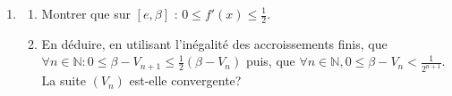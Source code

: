 \begin{exo}
\begin{description}
\begin{enumerate}
\begin{enumerate}
                                    \item En d\'eduire que $\beta \in [e , 3]$.
                                    \item Montrer par r\'ecurrence que : $\forall n \in \mathbb{N} , V_n \in [3 , \beta ]$.
                              \end{enumerate}
                        \item \begin{enumerate}
                                    \item Montrer que sur $[e , \beta]$ : $0 \leq f'(x) \leq \frac{1}{2}$.
                                    \item En d\'eduire, en utilisant l'in\'egalit\'e des accroissements finis, que
                                          $\forall n \in \mathbb{N} : 0 \leq \beta - V_{n+1} \leq \frac{1}{2} (\beta - V_n)$ 
                                          puis, que $\forall n \in \mathbb{N} , 0 \leq \beta - V_n < \frac{1}{2^{n+1}}$.
                                          La suite $(V_n)$ est-elle convergente?
                              \end{enumerate}
                  \end{enumerate}
      \end{description}
\end{exo}
